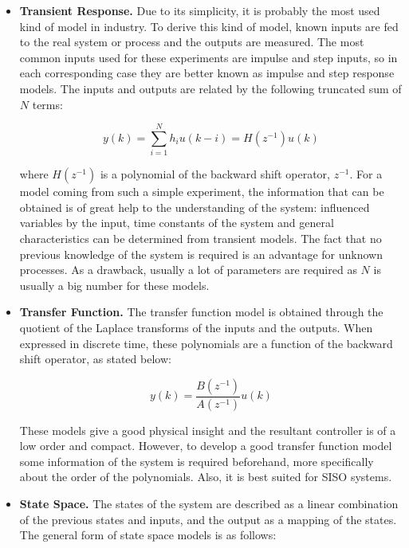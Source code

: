\begin{itemize}

\item \textbf{Transient Response.} Due to its simplicity, it is probably the most used kind of model in industry. To derive this kind of model, known inputs are fed to the real system or process and the outputs are measured. The most common inputs used for these experiments are impulse and step inputs, so in each corresponding case they are better known as impulse and step response models. The inputs and outputs are related by the following truncated sum of $N$ terms:

\begin{equation} \label{impulsemodel1}
y(k) = \sum_{i=1}^N h_i u(k-i) = H(z^{-1})u(k)
\end{equation}

where $H(z^{-1})$ is a polynomial of the backward shift operator, $z^{-1}$. For a model coming from such a simple experiment, the information that can be obtained is of great help to the understanding of the system: influenced variables by the input, time constants of the system and general characteristics can be determined from transient models. The fact that no previous knowledge of the system is required is an advantage for unknown processes. As a drawback, usually a lot of parameters are required as $N$ is usually a big number for these models.

\item \textbf{Transfer Function.} The transfer function model is obtained through the quotient of the Laplace transforms of the inputs and the outputs. When expressed in discrete time, these polynomials are a function of the backward shift operator, as stated below:

\begin{equation} \label{transferfunctionmodel1}
y(k) = \frac{B(z^{-1})}{A(z^{-1})}u(k)
\end{equation}

These models give a good physical insight and the resultant controller is of a low order and compact. However, to develop a good transfer function model some information of the system is required beforehand, more specifically about the order of the polynomials. Also, it is best suited for SISO systems.

\item \textbf{State Space.} The states of the system are described as a linear combination of the previous states and inputs, and the output as a mapping of the states. The general form of state space models is as follows:


\end{itemize}
